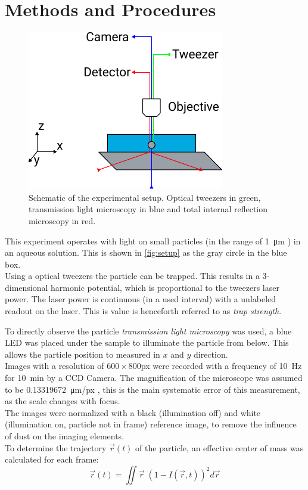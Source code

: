\documentclass[
    twoside=false,
    twocolumn=true,
    fontsize=11pt,
]{scrarticle}
\begin{document}


\section{Methods and Procedures}
\begin{figure}
    \centering
    \includegraphics{figures/setup.pdf}
    \caption{Schematic of the experimental setup. Optical tweezers in green, transmission light microscopy in blue and total internal reflection microscopy in red.}
    \label{fig:setup}
\end{figure}
This experiment operates with light on small particles (in the range of \SI{1}{\micro m} \cite{instructions}) in an aqueous solution.
This is shown in \autoref{fig:setup} as the gray circle in the blue box. \\
Using a optical tweezers the particle can be trapped.
This results in a 3-dimensional harmonic potential, which is proportional to the tweezers laser power.
The laser power is continuous (in a used interval) with a unlabeled readout on the laser.
This is value is henceforth referred to as \emph{trap strength}.

To directly observe the particle \emph{transmission light microscopy} was used, a blue LED was placed under the sample to illuminate the particle from below.
This allows the particle position to measured in $x$ and $y$ direction.\\
Images with a resolution of $600\times 800$\si{px} were recorded with a frequency of \SI{10}{Hz} for \SI{10}{min} by a CCD Camera.
The magnification of the microscope was assumed to be \SI{0.13319672}{\micro m/px} \cite{instructions}, this is the main systematic error of this measurement, as the scale changes with focus.\\
The images were normalized with a black (illumination off) and white (illumination on, particle not in frame) reference image, to remove the influence of dust on the imaging elements.\\
To determine the trajectory $\vec r(t)$ of the particle, an effective center of mass was calculated for each frame:
\begin{equation}
    \vec{r}(t) = \iint \vec{r} \; \left(1-I(\vec{r}, t)\right)^2 d\vec{r}    
\end{equation}
\end{document}
